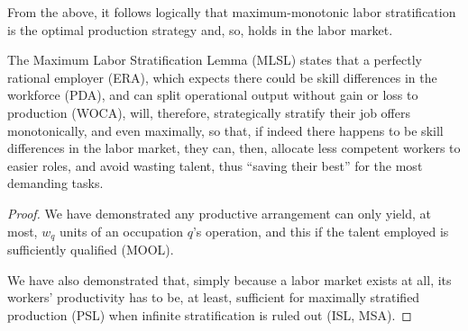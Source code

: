 \documentclass[hidelinks, nonatbib]{elsarticle}
\begin{document}
From the above, it follows logically that maximum-monotonic labor stratification is the optimal production strategy and, so, holds in the labor market.
\begin{lemma}
    \label{mlsl}
    The Maximum Labor Stratification Lemma (MLSL) states that a perfectly rational employer (ERA), which expects there could be skill differences in the workforce (PDA), and can split operational output without gain or loss to production (WOCA), will, therefore, strategically stratify their job offers monotonically, and even maximally, so that, if indeed there happens to be skill differences in the labor market, they can, then, allocate less competent workers to easier roles, and avoid wasting talent, thus ``saving their best'' for the most demanding tasks.

    \begin{proof}
        We have demonstrated any productive arrangement can only yield, at most, $w_q$ units of an occupation $q$'s operation, and this if the talent employed is sufficiently qualified (MOOL).

        We have also demonstrated that, simply because a labor market exists at all, its workers' productivity has to be, at least, sufficient for maximally stratified production (PSL) when infinite stratification is ruled out (ISL, MSA).


\end{proof}
\end{lemma}
\end{document}
